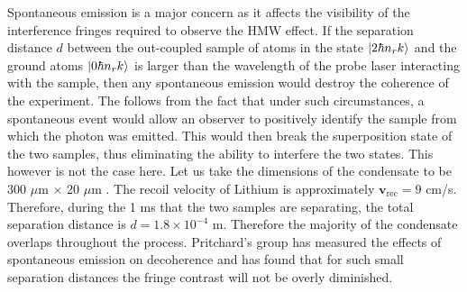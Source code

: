Spontaneous emission is a major concern as it affects the visibility of the interference fringes required to observe the HMW effect.  If the separation distance $d$ between the out-coupled sample of atoms in the state $\ket{2\hbar n_r k}$ and the ground atoms $\ket{0\hbar n_r k}$ is larger than the wavelength of the probe laser interacting with the sample, then any spontaneous emission would destroy the coherence of the experiment.  The follows from the fact that under such circumstances, a spontaneous event would allow an observer to positively identify the sample from which the photon was emitted.  This would then break the superposition state of the two samples, thus eliminating the ability to interfere the two states.  
This however is not the case here.  Let us take the dimensions of the condensate to be 300 $\mu$m $\times$ 20 $\mu$m \cite{BEC}. The recoil velocity of Lithium is approximately $\mathbf{v}_{\mathrm{rec}}=9$ cm/s.  Therefore, during the 1 ms that the two samples are separating, the total separation distance is $d=1.8\times 10^{-4}$ m. Therefore the majority of the condensate overlaps throughout the process. Pritchard's group \cite{decoherence} has measured the effects of spontaneous emission on decoherence and has found that for such small separation distances the fringe contrast will not be overly diminished. 

